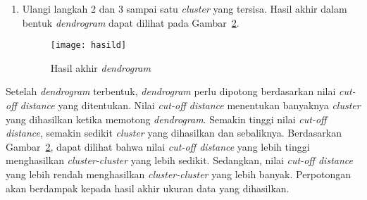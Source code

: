 \begin{enumerate}
\begin{equation} 
\begin{split}
d(A,C) & = \sqrt{(2 - 2)^2+(4 - 6)^2} \\
& = 4.47 
\end{split}
\end{equation}

\begin{equation} 
\begin{split}
d(B,C) & = \sqrt{(2 - 3)^2+(4 - 6)^2} \\
& = 3.61 
\end{split}
\end{equation}


Berdasarkan perhitungan di atas, nilai 3.61 diambil sebagai hasil karena nilai tersebut lebih kecil dibandingkan 4.47. Contoh hasil dapat dilihat pada Gambar~\ref{fig:step3}. 

\begin{figure}[H]
    \centering  
    \texttt{[image: step3]}  
    \caption[Hasil rekalkulasi]{Hasil rekalkulasi} 
    \label{fig:step3} 
\end{figure}

\item Ulangi langkah 2 dan 3 sampai satu \textit{cluster} yang tersisa. Hasil akhir dalam bentuk \textit{dendrogram} dapat dilihat pada Gambar~\ref{fig:hasild}.

\begin{figure}[H]
    \centering  
    \texttt{[image: hasild]}  
    \caption[Hasil akhir \textit{dendrogram} ]{Hasil akhir \textit{dendrogram}} 
    \label{fig:hasild} 
\end{figure}

\end{enumerate}

Setelah \textit{dendrogram} terbentuk, \textit{dendrogram} perlu dipotong berdasarkan nilai \textit{cut-off distance} yang ditentukan. Nilai \textit{cut-off distance} menentukan banyaknya \textit{cluster} yang dihasilkan ketika memotong \textit{dendrogram}. Semakin tinggi nilai \textit{cut-off distance}, semakin sedikit \textit{cluster} yang dihasilkan dan sebaliknya. Berdasarkan Gambar~\ref{fig:hasild}, dapat dilihat bahwa nilai \textit{cut-off distance} yang lebih tinggi menghasilkan \textit{cluster-cluster} yang lebih sedikit. Sedangkan, nilai \textit{cut-off distance} yang lebih rendah menghasilkan \textit{cluster-cluster} yang lebih banyak. Perpotongan akan berdampak kepada hasil akhir ukuran data yang dihasilkan. 

